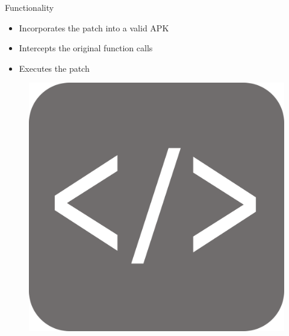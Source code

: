 \documentclass[aspectratio=169]{beamer}
[aspectratio=169] %
\begin{document}
\begin{frame}{Functionality}
  \begin{minipage}{0.49\textwidth} 
    \begin{itemize}
      \item Incorporates the patch into a valid APK
      \item Intercepts the original function calls
      \item Executes the patch
    \end{itemize}
  \end{minipage}
  \hfill
  \begin{minipage}{0.49\textwidth} 
    \begin{figure}
      \centering
      \includegraphics[height=0.5\textheight]{figures/code.png}
    \end{figure}
  \end{minipage}
\end{frame}
\end{document}
